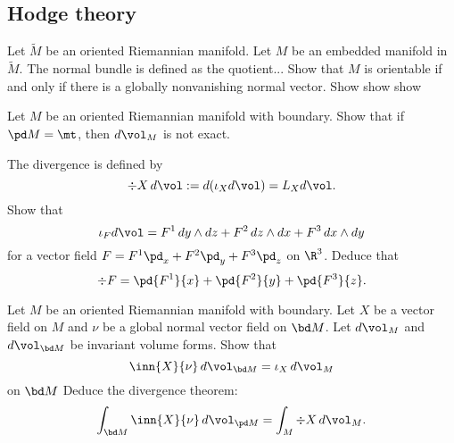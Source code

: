 \documentclass[11pt]{article}
\begin{document}
\subsection{Hodge theory}

\begin{prb}
Let $\tilde M$ be an oriented Riemannian manifold.
Let $M$ be an embedded manifold in $\tilde M$.
The normal bundle is defined as the quotient...
\q Show that $M$ is orientable if and only if there is a globally nonvanishing normal vector.
\q Show show show
\end{prb}


\begin{prb}
Let $M$ be an oriented Riemannian manifold with boundary.
\q Show that if $\pd M=\mt$, then $d\vol_M$ is not exact.
\end{prb}

\begin{prb}[Divergence]
The divergence is defined by
  \[\div X\,d\vol:=d(\iota_Xd\vol)=L_Xd\vol.\]
\q Show that
  \[\iota_Fd\vol=F^1\,dy\wedge dz+F^2\,dz\wedge dx+F^3\,dx\wedge dy\]
for a vector field $F=F^1\pd_x+F^2\pd_y+F^3\pd_z$ on $\R^3$.
\q Deduce that
  \[\div F=\pd{F^1}{x}+\pd{F^2}{y}+\pd{F^3}{z}.\]
\end{prb}

\begin{prb}
Let $M$ be an oriented Riemannian manifold with boundary.
Let $X$ be a vector field on $M$ and $\nu$ be a global normal vector field on $\bd M$.
Let $d\vol_M$ and $d\vol_{\bd M}$ be invariant volume forms.
\q Show that \[\inn{X}{\nu}\,d\vol_{\bd M}=\iota_X\,d\vol_M\] on $\bd M$
\q Deduce the divergence theorem: \[\int_{\bd M}\inn{X}{\nu}\,d\vol_{\pd M}=\int_M\div X\,d\vol_M.\]
\end{prb}
\end{document}
